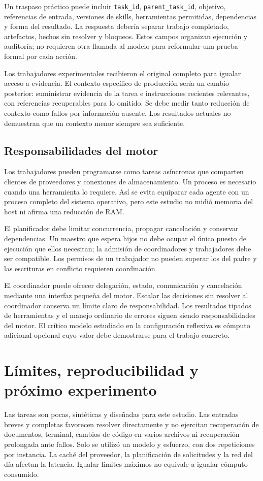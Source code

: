 Un traspaso práctico puede incluir \texttt{task\_id}, \texttt{parent\_task\_id}, objetivo, referencias de entrada, versiones de skills, herramientas permitidas, dependencias y forma del resultado. La respuesta debería separar trabajo completado, artefactos, hechos sin resolver y bloqueos. Estos campos organizan ejecución y auditoría; no requieren otra llamada al modelo para reformular una prueba formal por cada acción.

Los trabajadores experimentales recibieron el original completo para igualar acceso a evidencia. El contexto específico de producción sería un cambio posterior: suministrar evidencia de la tarea e instrucciones recientes relevantes, con referencias recuperables para lo omitido. Se debe medir tanto reducción de contexto como fallos por información ausente. Los resultados actuales no demuestran que un contexto menor siempre sea suficiente.

\subsection{Responsabilidades del motor}
Los trabajadores pueden programarse como tareas asíncronas que comparten clientes de proveedores y conexiones de almacenamiento. Un proceso es necesario cuando una herramienta lo requiere. Así se evita equiparar cada agente con un proceso completo del sistema operativo, pero este estudio no midió memoria del host ni afirma una reducción de RAM.

El planificador debe limitar concurrencia, propagar cancelación y conservar dependencias. Un maestro que espera hijos no debe ocupar el único puesto de ejecución que ellos necesitan; la admisión de coordinadores y trabajadores debe ser compatible. Los permisos de un trabajador no pueden superar los del padre y las escrituras en conflicto requieren coordinación.

El coordinador puede ofrecer delegación, estado, comunicación y cancelación mediante una interfaz pequeña del motor. Escalar las decisiones sin resolver al coordinador conserva un límite claro de responsabilidad. Los resultados tipados de herramientas y el manejo ordinario de errores siguen siendo responsabilidades del motor. El crítico modelo estudiado en la configuración reflexiva es cómputo adicional opcional cuyo valor debe demostrarse para el trabajo concreto.

\section{Límites, reproducibilidad y próximo experimento}
Las tareas son pocas, sintéticas y diseñadas para este estudio. Las entradas breves y completas favorecen resolver directamente y no ejercitan recuperación de documentos, terminal, cambios de código en varios archivos ni recuperación prolongada ante fallos. Solo se utilizó un modelo y esfuerzo, con dos repeticiones por instancia. La caché del proveedor, la planificación de solicitudes y la red del día afectan la latencia. Igualar límites máximos no equivale a igualar cómputo consumido.

